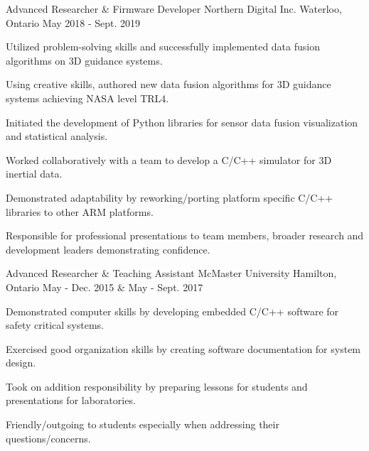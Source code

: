 
\begin{cventries}

  \cventry
    {Advanced Researcher \& Firmware Developer} %
    {Northern Digital Inc.} %
    {Waterloo, Ontario} %
    {May 2018 - Sept. 2019} %
    {
      \begin{cvitems} %
        \item {Utilized problem-solving skills and successfully implemented data fusion algorithms on 3D guidance systems.}
        \item {Using creative skills, authored new data fusion algorithms for 3D guidance systems achieving NASA level TRL4.}
        \item {Initiated the development of Python libraries for sensor data fusion visualization and statistical analysis.}
        \item {Worked collaboratively with a team to develop a C/C++ simulator for 3D inertial data.}
        \item {Demonstrated adaptability by reworking/porting platform specific C/C++ libraries to other ARM platforms.}
        \item {Responsible for professional presentations to team members, broader research and development leaders demonstrating confidence.}
      \end{cvitems}
    }

  \cventry
    {Advanced Researcher \& Teaching Assistant} %
    {McMaster University} %
    {Hamilton, Ontario} %
    {May - Dec. 2015 \& May - Sept. 2017} %
    {
      \begin{cvitems} %
        \item {Demonstrated computer skills by developing embedded C/C++ software for safety critical systems.}
        \item {Exercised good organization skills by creating software documentation for system design.}
        \item {Took on addition responsibility by preparing lessons for students and presentations for laboratories.}
        \item {Friendly/outgoing to students especially when addressing their questions/concerns.}
      \end{cvitems}
    }


\end{cventries}
